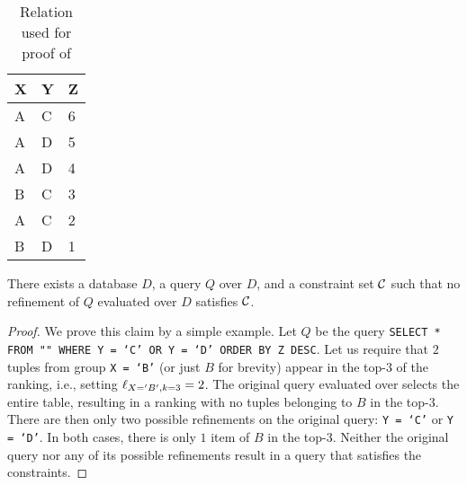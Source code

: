 \begin{table}%
    \caption{Relation used for proof of }
    \label{tab:no-perfect}
    \small
    \footnotesize
    \begin{tabular}{lll}
    \hline
    \textbf{X} & \textbf{Y} & \textbf{Z} \\ \hline
            A           & C               & 6          \\
            A           & D               & 5           \\
            A           & D               & 4           \\
            B           & C               & 3          \\
            A           & C               & 2          \\
            B           & D               & 1          \\
            \hline
    \end{tabular}
\end{table}

\begin{theorem}
	\label{thm:no-perfect}
	There exists a database $D$, a query $Q$ over $D$, and a constraint set $\mathcal{C}$ such that no refinement of $Q$ evaluated over $D$ satisfies $\mathcal{C}$.
\begin{proof}
	We prove this claim by a simple example. Let $Q$ be the query {\tt SELECT * FROM "" WHERE Y = `C' OR Y = `D' ORDER BY Z DESC}. Let us require that $2$ tuples from group {\tt X = `B'} (or just $B$ for brevity) appear in the top-$3$ of the ranking, i.e., setting $\ell_{X='B', k=3} = 2$. The original query evaluated over  selects the entire table, resulting in a ranking with no tuples belonging to $B$ in the top-$3$. There are then only two possible refinements on the original query: {\tt Y = `C'} or {\tt Y = `D'}. In both cases, there is only $1$ item of $B$ in the top-$3$.
    Neither the original query nor any of its possible refinements result in a query that satisfies the constraints.%
\end{proof}
\end{theorem}

